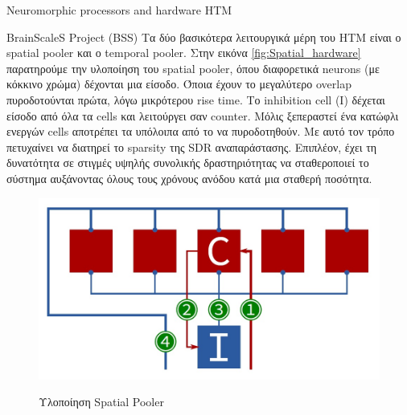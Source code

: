 \documentclass[a4paper,11pt]{article}
\begin{document}
\begin{section}{Neuromorphic processors and hardware HTM}
\begin{subsection}{BrainScaleS Project (BSS)}
    Τα δύο βασικότερα λειτουργικά μέρη του HTM είναι ο spatial pooler και ο temporal pooler. Στην εικόνα \eqref{fig:Spatial_hardware} παρατηρούμε την υλοποίηση του spatial pooler, όπου διαφορετικά neurons (με κόκκινο χρώμα) δέχονται μια είσοδο. Όποια έχουν το μεγαλύτερο overlap πυροδοτούνται πρώτα, λόγω μικρότερου rise time. Το inhibition cell  (Ι) δέχεται είσοδο από όλα τα cells και λειτούργει σαν counter. Μόλις ξεπεραστεί ένα κατώφλι ενεργών cells αποτρέπει τα υπόλοιπα από το να πυροδοτηθούν. Με αυτό τον τρόπο πετυχαίνει να διατηρεί το sparsity της SDR αναπαράστασης. Επιπλέον, έχει τη δυνατότητα σε στιγμές υψηλής συνολικής δραστηριότητας να σταθεροποιεί το σύστημα αυξάνοντας όλους τους χρόνους ανόδου κατά μια σταθερή ποσότητα.\\
    \begin{figure}[H]
      \centering%
      {\includegraphics[width=0.45\columnwidth,clip=true]{pics/spatial_hardware.jpg}}
      \caption{Υλοποίηση Spatial Pooler} \label{fig:Spatial_hardware}
    \end{figure}


\end{subsection}
\end{section}
\end{document}
